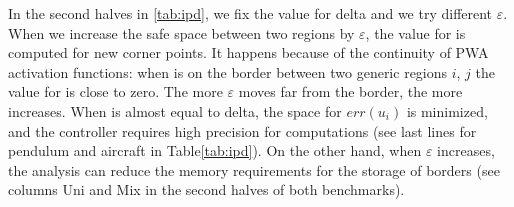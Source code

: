 In the second halves in \autoref{tab:ipd}, we fix the value for delta and we try different $\varepsilon$. When we increase the safe space between two regions by $\varepsilon$, the value for \maxUij is computed for new corner points. It happens because of the continuity of PWA activation functions: when \statevarmath is on the border between two generic regions $i$, $j$ the value for \maxUij is close to zero. The more $\varepsilon$ moves \statevarmath far from the border, the more \maxUij increases. When \maxUij is almost equal to delta, the space for $err(u_{i})$ is minimized, and the controller requires high precision for computations (see last lines for pendulum and aircraft in Table\ref{tab:ipd}). On the other hand, when $\varepsilon$ increases, the analysis can reduce the memory requirements for the storage of borders (see columns Uni and Mix in the second halves of both benchmarks).




